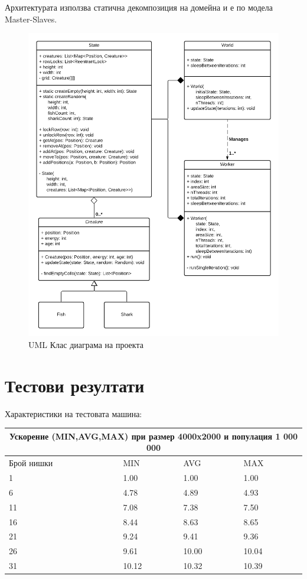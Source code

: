 \documentclass{article}
\begin{document}
Архитектурата използва статична декомпозиция на домейна и е по модела Master-Slaves.

\begin{figure}[H]
	\centering
	\includegraphics[width=1.1\textwidth]{classes-uml.png}
	\caption{UML Клас диаграма на проекта}
	\label{fig:figure1}
\end{figure}

\section{Тестови резултати}

Характеристики на тестовата машина: 

\begin{tabular}{ |p{3cm}||p{3cm}|p{3cm}|p{3cm}|  }
 \hline
 \multicolumn{4}{|c|}{Ускорение (MIN,AVG,MAX) при размер 4000x2000 и популация 1 000 000} \\
 \hline
 Брой нишки & MIN & AVG & MAX \\
 \hline
 1  & 1.00  & 1.00  & 1.00 \\
 6  & 4.78  & 4.89  & 4.93 \\
 11 & 7.08  & 7.38  & 7.50 \\
 16 & 8.44  & 8.63  & 8.65 \\
 21 & 9.24  & 9.41  & 9.36 \\
 26 & 9.61  & 10.00 & 10.04 \\
 31 & 10.12 & 10.32 & 10.39 \\
 \hline
\end{tabular}
\end{document}
